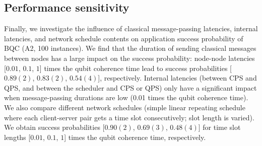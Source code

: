 \subsection{Performance sensitivity}
Finally, we investigate the influence of classical message-passing latencies, internal latencies, and network schedule contents on application success probability of BQC (A2, 100 instances).
We find that the duration of sending classical messages between nodes has a large impact on the success probability:
node-node latencies [$0.01$, $0.1$, $1$] times the qubit coherence time lead to success probabilities [$0.89(2)$, $0.83(2)$, $0.54(4)$], respectively.
Internal latencies (between CPS and QPS, and between the scheduler and CPS or QPS) only have a significant impact when message-passing durations are low (0.01 times the qubit coherence time).
We also compare different network schedules (simple linear repeating schedule where each client-server pair gets a time slot consecutively; slot length is varied).
We obtain success probabilities [$0.90(2)$, $0.69(3)$, $0.48(4)$] for time slot lengths [$0.01$, $0.1$, $1$] times the qubit coherence time, respectively.
